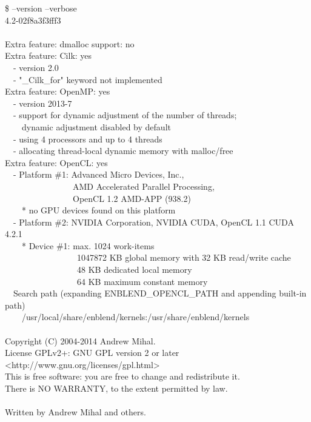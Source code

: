 \begin{exemplar}[htbp]
  \begin{maxipage}
    \centering
    \begin{terminal}
      \$ \app{} --version --verbose \\
      \app{} 4.2-02f8a3f3fff3 \\
      ~ \\
      Extra feature: dmalloc support: no \\
      Extra feature: Cilk: yes \\
      ~~- version 2.0 \\
      ~~- "\_Cilk\_for" keyword not implemented \\
      Extra feature: OpenMP: yes \\
      ~~- version 2013-7 \\
      ~~- support for dynamic adjustment of the number of threads; \\
      ~~~~dynamic adjustment disabled by default \\
      ~~- using 4 processors and up to 4 threads \\
      ~~- allocating thread-local dynamic memory with malloc/free \\
      Extra feature: OpenCL: yes \\
      ~~- Platform \#1: Advanced Micro Devices, Inc., \bslash \\
      ~~~~~~~~~~~~~~~~AMD Accelerated Parallel Processing, \bslash \\
      ~~~~~~~~~~~~~~~~OpenCL 1.2 AMD-APP (938.2) \\
      ~~~~* no GPU devices found on this platform \\
      ~~- Platform \#2: NVIDIA Corporation, NVIDIA CUDA, OpenCL 1.1 CUDA 4.2.1 \\
      ~~~~* Device \#1: max. 1024 work-items \\
      ~~~~~~~~~~~~~~~~~1047872 KB global memory with 32 KB read/write cache \\
      ~~~~~~~~~~~~~~~~~48 KB dedicated local memory \\
      ~~~~~~~~~~~~~~~~~64 KB maximum constant memory \\
      ~~Search path (expanding ENBLEND\_OPENCL\_PATH and appending built-in path) \\
      ~~~~/usr/local/share/enblend/kernels:/usr/share/enblend/kernels \\
      ~ \\
      Copyright (C) 2004-2014 Andrew Mihal. \\
      License GPLv2+: GNU GPL version 2 or later <http://www.gnu.org/licenses/gpl.html> \\
      This is free software: you are free to change and redistribute it. \\
      There is NO WARRANTY, to the extent permitted by law. \\
      ~ \\
      Written by Andrew Mihal and others.
    \end{terminal}
  \end{maxipage}


\end{exemplar}
